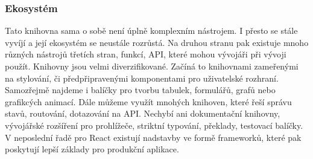 \subsubsection{Ekosystém}

Tato knihovna sama o sobě není úplně komplexním nástrojem. I přesto se stále vyvíjí a její ekosystém se neustále rozrůstá. 
Na druhou stranu pak existuje mnoho různých nástrojů třetích stran, funkcí, API, které mohou vývojáři při vývoji použít.
Knihovny jsou velmi diverzifikované. Začíná to knihovnami zameřenými na stylování, či předpřipravenými komponentami pro uživatelské rozhraní. 
Samozřejmě najdeme i balíčky pro tvorbu tabulek, formulářů, grafů nebo grafikcých animací.
Dále můžeme využít mnohých knihoven, které řeší správu stavů, routování, dotazování na API. 
Nechybí ani dokumentační knihovny, vývojářské rozšíření pro prohlížeče, striktní typování, překlady, testovací balíčky. 
V neposlední řadě pro React existují nadstavby ve formě frameworků, které pak poskytují lepší základy pro produkční aplikace.\cite{awesomereact,builderreacteco,react}